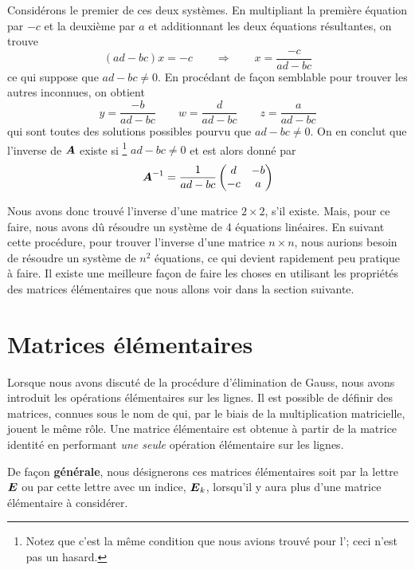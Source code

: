 Considérons le premier de ces deux systèmes.  
En multipliant la première équation par $-c$ et la deuxième par $a$ et additionnant les deux équations résultantes, on trouve
\[
(ad - bc) x = -c \qquad\Rightarrow\qquad x = \frac{-c}{ad-bc}
\]
ce qui suppose que $ad-bc\neq 0$.  En procédant de façon semblable pour trouver les autres inconnues, on obtient
\[
y = \frac{-b}{ad-bc} \qquad w = \frac{d}{ad-bc} \qquad
z = \frac{a}{ad-bc}
\]
qui sont toutes des solutions possibles pourvu que $ad-bc\neq0$.   On en conclut que l'inverse de $\boldsymbol{A}$ existe si%
\footnote{\label{footnote:2par2}Notez que c'est la même condition que nous avions trouvé pour l'; ceci
n'est pas un hasard.}
$ad-bc\neq0$ et est alors donné par 
\[
\boldsymbol{A}^{-1} = \frac{1}{ad-bc}\begin{pmatrix}
d & -b \\
-c & a
\end{pmatrix}
\]

Nous avons donc trouvé l'inverse d'une matrice $2\times2$, s'il existe.  Mais, pour ce faire, nous avons dû résoudre un système de 4 équations linéaires. 
 En suivant cette procédure, pour trouver l'inverse d'une matrice $n\times n$, nous aurions besoin de résoudre un système de $n^2$ équations, ce qui devient rapidement peu pratique à faire.  
 Il existe une meilleure façon de faire les choses en utilisant les propriétés des matrices élémentaires que nous allons voir dans la section suivante.

\section{Matrices élémentaires}
Lorsque nous avons discuté de la procédure d'élimination de Gauss,
nous avons introduit les opérations élémentaires sur les lignes.
Il est possible de définir des matrices, connues sous le nom
de  qui, par le biais
de la multiplication matricielle, jouent le même rôle.
Une matrice élémentaire est obtenue à partir de la matrice identité en 
performant \textit{une seule} opération élémentaire sur les lignes.

De façon \textbf{générale}, nous désignerons ces matrices élémentaires
soit par la lettre $\boldsymbol{E}$ ou par cette lettre avec un indice, $\boldsymbol{E}_k$,
lorsqu'il y aura plus d'une matrice élémentaire à considérer.

